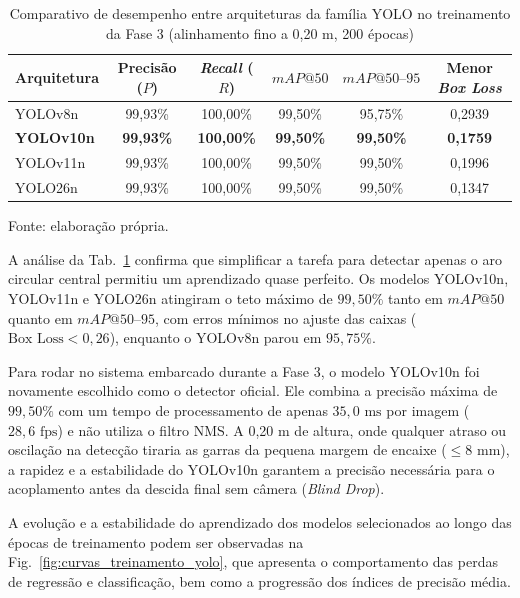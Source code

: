 \begin{table}[H]
	\centering
	\small
	\setlength{\tabcolsep}{5pt}
	\captionsetup{justification=centering}
	\caption{Comparativo de desempenho entre arquiteturas da família YOLO no treinamento da Fase 3 (alinhamento fino a 0,20 m, 200 épocas)}
	\label{tab:comparativo_yolo_fase3}
	\vspace{0.2cm}
	\begin{tabular}{lccccc}
		\hline
		\textbf{Arquitetura} & \textbf{Precisão ($P$)} & \textbf{\textit{Recall} ($R$)} & \textbf{$mAP@50$} & \textbf{$mAP@50\text{--}95$} & \textbf{Menor \textit{Box Loss}} \\
		\hline
		YOLOv8n  & 99,93\% & 100,00\% & 99,50\% & 95,75\% & 0,2939 \\
		\textbf{YOLOv10n} & \textbf{99,93\%} & \textbf{100,00\%} & \textbf{99,50\%} & \textbf{99,50\%} & \textbf{0,1759} \\
		YOLOv11n & 99,93\% & 100,00\% & 99,50\% & 99,50\% & 0,1996 \\
		YOLO26n  & 99,93\% & 100,00\% & 99,50\% & 99,50\% & 0,1347 \\
		\hline
	\end{tabular}
	\vspace{0.2cm}
	\begin{flushleft}
		\footnotesize Fonte: elaboração própria.
	\end{flushleft}
\end{table}

A análise da Tab.~\ref{tab:comparativo_yolo_fase3} confirma que simplificar a tarefa para detectar apenas o aro circular central permitiu um aprendizado quase perfeito. Os modelos YOLOv10n, YOLOv11n e YOLO26n atingiram o teto máximo de $99{,}50\%$ tanto em $mAP@50$ quanto em $mAP@50\text{--}95$, com erros mínimos no ajuste das caixas ($\text{Box Loss} < 0{,}26$), enquanto o YOLOv8n parou em $95{,}75\%$.

Para rodar no sistema embarcado durante a Fase 3, o modelo YOLOv10n foi novamente escolhido como o detector oficial. Ele combina a precisão máxima de $99{,}50\%$ com um tempo de processamento de apenas $35{,}0\text{ ms}$ por imagem ($28{,}6\text{ fps}$) e não utiliza o filtro NMS. A 0,20 m de altura, onde qualquer atraso ou oscilação na detecção tiraria as garras da pequena margem de encaixe ($\le 8\text{ mm}$), a rapidez e a estabilidade do YOLOv10n garantem a precisão necessária para o acoplamento antes da descida final sem câmera (\textit{Blind Drop}).

A evolução e a estabilidade do aprendizado dos modelos selecionados ao longo das épocas de treinamento podem ser observadas na Fig.~\ref{fig:curvas_treinamento_yolo}, que apresenta o comportamento das perdas de regressão e classificação, bem como a progressão dos índices de precisão média.


